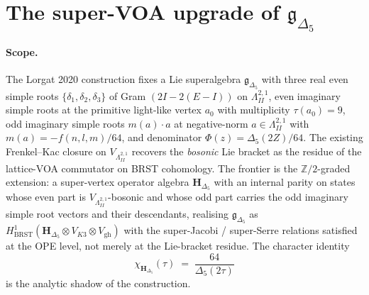 
\providecommand{\ClaimStatusTheorem}{[Theorem]}
\providecommand{\ClaimStatusProvedHere}{[Proved here]}
\providecommand{\ClaimStatusProvedElsewhere}{[Proved in primary literature]}
\providecommand{\ClaimStatusConditional}{[Conditional]}
\providecommand{\ClaimStatusConjectured}{[Conjectured]}
\providecommand{\kBKM}{\kappa_{\mathrm{BKM}}}
\providecommand{\kch}{\kappa_{\mathrm{ch}}}
\providecommand{\fg}{\mathfrak{g}}
\providecommand{\fn}{\mathfrak{n}}
\providecommand{\fh}{\mathfrak{h}}
\providecommand{\fimag}{\mathfrak{imag}}
\providecommand{\Lam}{\Lambda}
\providecommand{\Lamii}{\Lambda^{2,1}_{II}}
\providecommand{\Muk}{\mathrm{Muk}}
\providecommand{\BRST}{\mathrm{BRST}}
\providecommand{\NS}{\mathrm{NS}}
\providecommand{\Ram}{\mathrm{R}}
\providecommand{\SpCh}{\mathrm{Sp}}
\providecommand{\PhiFA}{\Phi^{\mathrm{FA}}}
\providecommand{\Perf}{\mathrm{Perf}}
\providecommand{\Sym}{\mathrm{Sym}}
\providecommand{\Cliff}{\mathrm{Cl}}
\providecommand{\Fock}{\mathcal{F}}
\providecommand{\HH}{\mathbf{H}}
\providecommand{\Hb}{\mathbf{H}_{\Delta_5}}
\providecommand{\Z}{\mathbb{Z}}
\providecommand{\C}{\mathbb{C}}
\providecommand{\R}{\mathbb{R}}
\providecommand{\HHspace}{\mathbb{H}}
\providecommand{\ZZ}{\mathbb{Z}}
\providecommand{\CC}{\mathbb{C}}

\section{The super-VOA upgrade of $\fg_{\Delta_5}$}
\label{wn:sec:wave15-a4-H-delta5-VOA}

\paragraph{Scope.}
The Lorgat 2020 construction fixes a Lie superalgebra
$\fg_{\Delta_5}$ with three real even simple roots
$\{\delta_1, \delta_2, \delta_3\}$ of Gram $(2 I - 2(E - I))$ on
$\Lamii$, even imaginary simple roots at the primitive light-like
vertex $a_0$ with multiplicity $\tau(a_0) = 9$, odd imaginary simple
roots $m(a)\cdot a$ at negative-norm $a \in \Lamii$ with
$m(a) = -f(n,l,m)/64$, and denominator $\Phi(z) = \Delta_5(2Z)/64$.
The existing Frenkel--Kac closure on $V_{\Lamii}$ recovers the
\emph{bosonic} Lie bracket as the residue of the lattice-VOA
commutator on BRST cohomology. The frontier is the
$\ZZ/2$-graded extension: a super-vertex operator algebra $\Hb$ with
an internal parity on states whose even part is $V_{\Lamii}$-bosonic
and whose odd part carries the odd imaginary simple root vectors
and their descendants, realising $\fg_{\Delta_5}$ as
$H^1_{\BRST}(\Hb \otimes V_{K3} \otimes V_{\mathrm{gh}})$ with the
super-Jacobi / super-Serre relations satisfied at the OPE
level, not merely at the Lie-bracket residue. The character
identity
\[
  \chi_{\Hb}(\tau) \;=\; \frac{64}{\Delta_5(2\tau)}
\]
is the analytic shadow of the construction.

